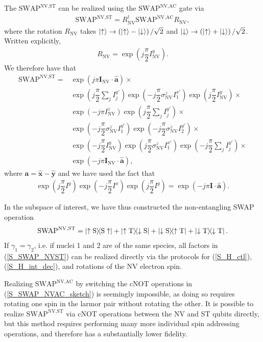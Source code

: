 \documentclass[twocolumn]{revtex4-1}
\renewcommand{\t}{\text} %
\newcommand{\f}[2]{\dfrac{#1}{#2}} %
\newcommand{\p}[1]{\left(#1\right)} %
\renewcommand{\v}{\bm} %
\newcommand{\uv}[1]{\hat{\v{#1}}} %
\renewcommand{\c}{\cdot} %
\renewcommand{\u}{\uparrow}
\renewcommand{\d}{\downarrow}
\newcommand{\SWAP}{\t{SWAP}}
\newcommand{\NV}{\t{NV}}
\newcommand{\AC}{\t{AC}}
\newcommand{\ST}{\t{ST}}
\renewcommand{\S}{\t{S}}
\newcommand{\T}{\t{T}}
\begin{document}
The $\SWAP^{\NV,\ST}$ can be realized using the $\SWAP^{\NV,\AC}$ gate
via
\begin{align}
  \SWAP^{\NV,\ST} = R_\NV^\dagger \SWAP^{\NV,\AC} R_\NV,
\end{align}
where the rotation $R_\NV$ takes $\ket\u\to\p{\ket\u-\ket\d}/\sqrt2$
and $\ket\d\to\p{\ket\u+\ket\d}/\sqrt2$. Written explicitly,
\begin{align}
  R_\NV = \exp\p{j\f\pi2 I_\NV^y}.
\end{align}
We therefore have that
\begin{align}
  \SWAP^{\NV,\ST}
  =& \exp\p{j\pi\v I_\NV\c\uv a} \times \tag*{} \\
   & \exp\p{j\f\pi2\sum_jI_j^{y'}}
     \exp\p{-j\f\pi2 \sigma_\NV^z I_1^{x'}}
     \exp\p{j\f\pi2 I_\NV^y} \times \tag*{} \\
   & \exp\p{-j\pi I_\NV^z}
     \exp\p{j\f\pi2\sum_jI_j^{y'}} \times \tag*{} \\
   & \exp\p{-j\f\pi2 \sigma_\NV^z I_1^{y'}}
     \exp\p{-j\f\pi2 \sigma_\NV^z I_2^{y'}} \times \tag*{} \\
   & \exp\p{-j\f\pi2 I_\NV^y}
     \exp\p{j\f\pi2 \sigma_\NV^z I_1^{x'}}
     \exp\p{-j\f\pi2\sum_jI_j^{y'}} \times \tag*{} \\
   & \exp\p{-j\pi\v I_\NV\c\uv a},
  \label{S_SWAP_NVST}
\end{align}
where $\v a = \uv x - \uv y$ and we have used the fact that
\begin{align}
  \exp\p{j\f\pi2 I^y} \exp\p{-j\f\pi2 I^x}
  \exp\p{j\f\pi2 I^y}
  = \exp\p{-j\pi\v I\c\uv a}.
\end{align}

In the subspace of interest, we have thus constructed the
non-entangling SWAP operation
\begin{align}
  \SWAP^{\NV,\ST} = \op{\u\S}{\S\u} + \op{\u\T}{\d\S}
  + \op{\d\S}{\u\T} + \op{\d\T}{\d\T}.
\end{align}
If $\gamma_1=\gamma_2$, i.e. if nuclei 1 and 2 are of the same
species, all factors in (\ref{S_SWAP_NVST}) can be realized directly
via the protocols for (\ref{S_H_ctl}), (\ref{S_H_int_dec}), and
rotations of the NV electron spin.

Realizing $\SWAP^{\NV,\AC}$ by switching the cNOT operations in
(\ref{S_SWAP_NVAC_sketch}) is seemingly impossible, as doing so
requires rotating one spin in the larmor pair without rotating the
other. It is possible to realize $\SWAP^{\NV,\ST}$ via cNOT operations
between the NV and ST qubits directly, but this method requires
performing many more individual spin addressing operations, and
therefore has a substantially lower fidelity.
\end{document}
